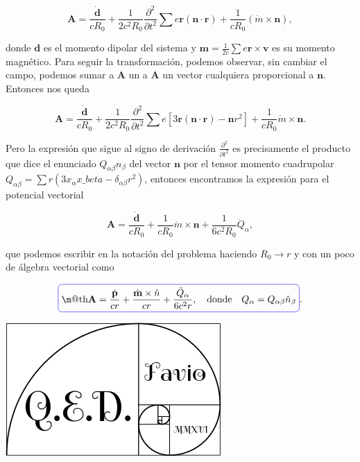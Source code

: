 \documentclass[a4paper,11pt]{article}
\makeatletter
\numberwithin{equation}{section}
\newcommand*{\boxcolor}{blue}
\renewcommand{\boxed}[1]{\textcolor{\boxcolor}{%
\tikz[baseline={([yshift=-1ex]current bounding box.center)}] \node [rectangle, minimum width=1ex,rounded corners,draw] {\normalcolor\m@th$\displaystyle#1$};}}
\makeatother
\begin{document}
\begin{equation}
 \mathbf{A} = \frac{\dot{\mathbf{d}}}{cR_0} + \frac{1}{2c^2R_0}\frac{\partial^2}{ 
 \partial t^2} \sum e \mathbf{r} (\mathbf{n} \cdot \mathbf{r}) + \frac{1}{cR_0} 
 (\dot{m} \times \mathbf{n}),
\end{equation}

donde $\mathbf{d}$ es el momento dipolar del sistema y $\mathbf{m} = \frac{1}{2c} 
\sum e \mathbf{r} \times \mathbf{v}$ es su momento magnético. Para seguir la 
transformación, podemos observar, sin cambiar el campo, podemos sumar a $\mathbf{A}$ 
un a $\mathbf{A}$ un vector cualquiera proporcional a $\mathbf{n}$. Entonces 
nos queda 

\begin{equation}
 \mathbf{A} = \frac{\dot{\mathbf{d}}}{cR_0} + \frac{1}{2c^2R_0}\frac{\partial^2}{ 
 \partial t^2}\sum e[3\mathbf{r}(\mathbf{n} \cdot \mathbf{r}) - \mathbf{n}r^2] + 
 \frac{1}{cR_0} \dot{m} \times \mathbf{n}.
\end{equation}

Pero la expresión que sigue al signo de derivación $\frac{\partial^2}{ 
\partial t^2}$ es precisamente el producto que dice el enunciado $Q_{\alpha\beta}n_\beta$ 
del vector $\mathbf{n}$ por el tensor momento cuadrupolar $Q_{\alpha\beta} = 
\sum r (3x_\alpha x\_beta - \delta_{\alpha\beta}r^2)$, entonces encontramos la 
expresión para el potencial vectorial 

\begin{equation}
 \mathbf{A} = \frac{\dot{\mathbf{d}}}{cR_0} + \frac{1}{cR_0}\dot{m}\times \mathbf{n} + 
 \frac{1}{6c^2R_0}\ddot{Q}_\alpha,
\end{equation}

que podemos escribir en la notación del problema haciendo $R_0 \rightarrow r$ y 
con un poco de álgebra vectorial como 

\begin{equation}
 \boxed{\mathbf{A} = \frac{\dot{\mathbf{p}}}{cr} + \frac{\dot{\mathbf{m}} \times 
 \hat{n}}{cr} + \frac{\ddot{Q}_{\alpha}}{6c^2r}, \quad \text{donde} \quad
 Q_\alpha = Q_{\alpha\beta} \hat{n}_\beta}.
\end{equation}

\hspace{10cm}\includegraphics[scale=0.25]{logoQED}
\end{document}
